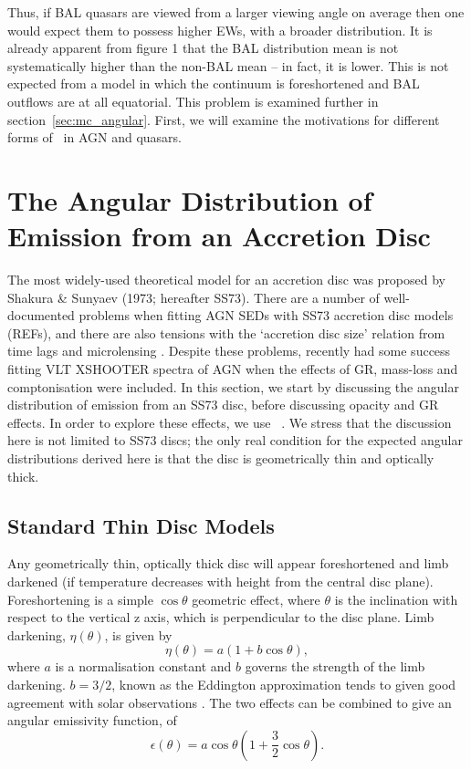Thus, if BAL quasars are viewed from a larger viewing angle on average then one
would expect them to possess higher EWs, with a broader distribution.
It is already apparent from figure 1 that the BAL distribution mean 
is not systematically higher than the non-BAL
mean -- in fact, it is lower. This is not expected from a model
in which the continuum is foreshortened and BAL outflows are at all equatorial.
This problem is examined further in section~\ref{sec:mc_angular}. 
First, we will examine the motivations for different forms of \ept\ 
in AGN and quasars.

\section{The Angular Distribution of Emission from an Accretion Disc}
\label{sec:disc_agn}

\noindent 
The most widely-used theoretical model for an accretion disc
was proposed by Shakura \& Sunyaev (1973; hereafter SS73). 
\nocite{shakurasunyaev1973}
There are a number of well-documented problems when fitting 
AGN SEDs with SS73 accretion disc models (REFs), and there are also 
tensions with the `accretion disc size' relation from time lags \citep{edelson2015}
and microlensing \citep{morgan2010}. Despite these problems, 
\cite{capellupo2015} recently had 
some success fitting VLT XSHOOTER spectra of AGN when the effects of
GR, mass-loss and comptonisation were included.
In this section, we start by discussing the angular distribution of
emission from an SS73 disc, before discussing opacity and GR 
effects. In order to explore these effects, we use \agn\
\citep{hubeny2000,davishubeny2006,davis2007}. We stress that the 
discussion here is not limited to SS73 discs; the only real condition
for the expected angular distributions derived here is that the 
disc is geometrically thin and optically thick.

\subsection{Standard Thin Disc Models}

\noindent
Any geometrically thin, optically thick disc will appear
foreshortened and limb darkened (if temperature decreases
with height from the central disc plane). 
Foreshortening is a simple $\cos \theta$ geometric effect, 
where $\theta$ is the inclination with respect to the vertical z axis, which
is perpendicular to the disc plane.
Limb darkening, $\eta(\theta)$, is given by
\begin{equation}
\eta(\theta) = a \left( 1 + b \cos \theta \right),
\end{equation}
where $a$ is a normalisation constant and $b$ governs the strength
of the limb darkening. $b=3/2$, known as the Eddington approximation
tends to given good agreement with solar observations 
\citep[e.g.][]{mihalas}. The two effects can be 
combined to give an angular emissivity function, of
\begin{equation}
\epsilon(\theta) = a \cos \theta \left( 1 + \frac{3}{2} \cos \theta \right).
\end{equation}

